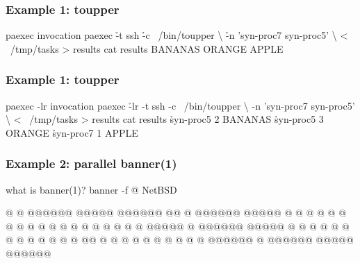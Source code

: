 \documentclass[hyperref={colorlinks=true}]{beamer}
\begin{document}
\begin{frame}[fragile]
  \frametitle{Example 1: toupper}

  \begin{block}{}
      \begin{CodeLarge}{paexec invocation}
\prompt{\$} paexec \h{-t} ssh \h{-c} ~/bin/toupper \textbackslash
   \h{-n} 'syn-proc7 syn-proc5' \textbackslash
   < ~/tmp/tasks > results
\prompt{\$} cat results
 BANANAS
 ORANGE
 APPLE
\prompt{\$}
      \end{CodeLarge}
  \end{block}
\end{frame}

\begin{frame}[fragile]
  \frametitle{Example 1: toupper}

  \begin{block}{}
      \begin{CodeLarge}{paexec -lr invocation}
\prompt{\$} paexec \h{-lr} -t ssh -c ~/bin/toupper \textbackslash
   -n 'syn-proc7 syn-proc5' \textbackslash
   < ~/tmp/tasks > results
\prompt{\$} cat results
\h{syn-proc5 2}  BANANAS
\h{syn-proc5 3}  ORANGE
\h{syn-proc7 1}  APPLE
\prompt{\$}
      \end{CodeLarge}
  \end{block}
\end{frame}


\linespread{0.5}
\begin{frame}[fragile]
  \frametitle{Example 2: parallel banner(1)}

  \begin{block}{}
      \begin{CodeLarge}{what is banner(1)?}
\prompt{\$} banner -f @ NetBSD

@     @                 @@@@@@   @@@@@  @@@@@@
@@    @  @@@@@@   @@@@@ @     @ @     @ @     @
@ @   @  @          @   @     @ @       @     @
@  @  @  @@@@@      @   @@@@@@   @@@@@  @     @
@   @ @  @          @   @     @       @ @     @
@    @@  @          @   @     @ @     @ @     @
@     @  @@@@@@     @   @@@@@@   @@@@@  @@@@@@


\prompt{\$}
      \end{CodeLarge}
  \end{block}
\end{frame}
\linespread{1}
\end{document}

